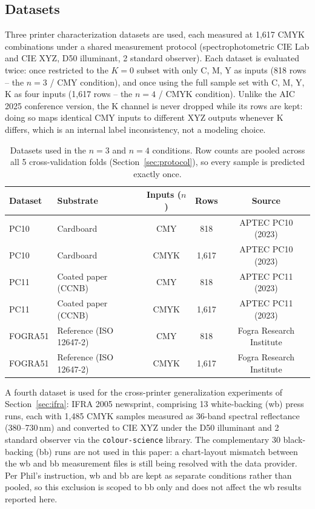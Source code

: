 \documentclass[11pt,a4paper]{article}
\begin{document}
\subsection{Datasets}
\label{sec:datasets}

Three printer characterization datasets are used, each measured at 1{,}617
CMYK combinations under a shared measurement protocol (spectrophotometric
CIE Lab and CIE XYZ, D50 illuminant, 2\textdegree{} standard observer). Each
dataset is evaluated twice: once restricted to the $K=0$ subset with only
C, M, Y as inputs (818 rows -- the $n=3$ / CMY condition), and once using
the full sample set with C, M, Y, K as four inputs (1{,}617 rows -- the
$n=4$ / CMYK condition). Unlike the AIC 2025 conference version, the K
channel is never dropped while its rows are kept: doing so maps identical
CMY inputs to different XYZ outputs whenever K differs, which is an internal
label inconsistency, not a modeling choice.

\begin{table}[h]
\centering
\caption{Datasets used in the $n=3$ and $n=4$ conditions. Row counts are
pooled across all 5 cross-validation folds (Section~\ref{sec:protocol}), so
every sample is predicted exactly once.}
\label{tab:datasets}
\begin{tabular}{@{}llccc@{}}
\toprule
Dataset & Substrate & Inputs ($n$) & Rows & Source \\
\midrule
PC10  & Cardboard          & CMY  & 818  & APTEC PC10 (2023) \\
PC10  & Cardboard          & CMYK & 1{,}617 & APTEC PC10 (2023) \\
PC11  & Coated paper (CCNB)& CMY  & 818  & APTEC PC11 (2023) \\
PC11  & Coated paper (CCNB)& CMYK & 1{,}617 & APTEC PC11 (2023) \\
FOGRA51 & Reference (ISO 12647-2) & CMY & 818 & Fogra Research Institute \citep{fogra2020} \\
FOGRA51 & Reference (ISO 12647-2) & CMYK & 1{,}617 & Fogra Research Institute \citep{fogra2020} \\
\bottomrule
\end{tabular}
\end{table}

A fourth dataset is used for the cross-printer generalization experiments of
Section~\ref{sec:ifra}: IFRA 2005 newsprint, comprising 13 white-backing (wb)
press runs, each with 1{,}485 CMYK samples measured as 36-band spectral
reflectance (380--730\,nm) and converted to CIE XYZ under the D50 illuminant
and 2\textdegree{} standard observer via the \texttt{colour-science} library.
The complementary 30 black-backing (bb) runs are not used in this paper: a
chart-layout mismatch between the wb and bb measurement files is still being
resolved with the data provider. Per Phil's instruction, wb and bb are kept
as separate conditions rather than pooled, so this exclusion is scoped to bb
only and does not affect the wb results reported here.
\end{document}
